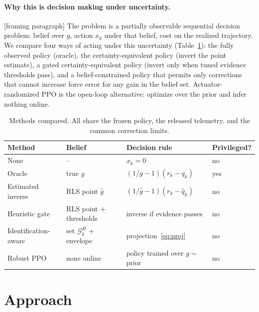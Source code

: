 \documentclass[10pt,twocolumn]{article}
\newcommand{\todo}[1]{\textcolor{red!70!black}{[#1]}}
\newcommand{\Gset}{\mathcal{G}}
\begin{document}
\paragraph{Why this is decision making under uncertainty.}
\todo{framing paragraph}
The problem is a partially observable sequential decision problem: belief over $g$, action
$x_k$ under that belief, cost on the realized trajectory. We compare four ways of acting
under this uncertainty (Table~\ref{tab:methods}): the fully observed policy (oracle), the
certainty-equivalent policy (invert the point estimate), a gated certainty-equivalent policy
(invert only when tuned evidence thresholds pass), and a belief-constrained policy that
permits only corrections that cannot increase force error for any gain in the belief set.
Actuator-randomized PPO is the open-loop alternative: optimize over the prior and infer
nothing online.

\begin{table}[t]\centering\small
\caption{Methods compared. All share the frozen policy, the released telemetry, and the common correction limits.}\label{tab:methods}
\begin{tabular}{llll}\toprule
Method & Belief & Decision rule & Privileged? \\\midrule
None & -- & $x_k=0$ & no \\
Oracle & true $g$ & $(1/g-1)(r_k-q_k)$ & yes \\
Estimated inverse & RLS point $\hat g$ & $(1/\hat g-1)(r_k-\hat q_k)$ & no \\
Heuristic gate & RLS point + thresholds & inverse if evidence passes & no \\
Identification-aware & set $\Gset_k^H$ + envelope & projection~\eqref{eq:proj} & no \\
Robust PPO & none online & policy trained over $g\sim$ prior & no \\\bottomrule
\end{tabular}
\end{table}

\section{Approach}
\end{document}
